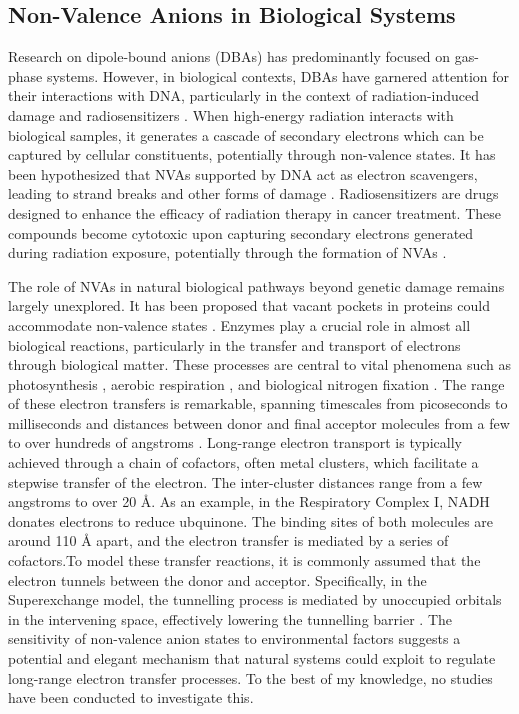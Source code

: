 \subsection{Non-Valence Anions in Biological Systems}

Research on dipole-bound anions (DBAs) has predominantly focused on gas-phase systems. However, in biological contexts, DBAs have garnered attention for their interactions with DNA, particularly in the context of radiation-induced damage and radiosensitizers \cite{gu2012interactions,narayanan2023secondary,sedmidubska2024interaction}.
When high-energy radiation interacts with biological samples, it generates a cascade of secondary electrons which can be captured by cellular constituents, potentially through non-valence states. It has been hypothesized that NVAs supported by DNA act as electron scavengers, leading to strand breaks and other forms of damage \cite{gu2012interactions,narayanan2023secondary,dutta2015electron,narayanan2024electron,sommerfeld2005dipole}.
Radiosensitizers are drugs designed to enhance the efficacy of radiation therapy in cancer treatment. These compounds become cytotoxic upon capturing secondary electrons generated during radiation exposure, potentially through the formation of NVAs \cite{sedmidubska2024interaction}.

The role of NVAs in natural biological pathways beyond genetic damage remains largely unexplored. It has been proposed that vacant pockets in proteins could accommodate non-valence states \cite{castellani2019stability}. Enzymes play a crucial role in almost all biological reactions, particularly in the transfer and transport of electrons through biological matter. These processes are central to vital phenomena such as photosynthesis \cite{mitchell1961coupling}, aerobic respiration \cite{wikstrom1977proton}, and biological nitrogen fixation \cite{rutledge2020electron}. The range of these electron transfers is remarkable, spanning timescales from picoseconds to milliseconds and distances between donor and final acceptor molecules from a few to over hundreds of angstroms \cite{gray1996electron,blumberger2015recent}. Long-range electron transport is typically achieved through a chain of cofactors, often metal clusters, which facilitate a stepwise transfer of the electron. The inter-cluster distances range from a few angstroms to over 20 \r{A}. As an example, in the Respiratory Complex I\cite{ernster1995biochemical}, NADH donates electrons to reduce ubquinone. The binding sites of both molecules are around 110 \r{A} apart, and the electron transfer is mediated by a series of cofactors.To model these transfer reactions, it is commonly assumed that the electron tunnels between the donor and acceptor. Specifically, in the Superexchange model, the tunnelling process is mediated by unoccupied orbitals in the intervening space, effectively lowering the tunnelling barrier \cite{blumberger2015recent}. The sensitivity of non-valence anion states to environmental factors suggests a potential and elegant mechanism that natural systems could exploit to regulate long-range electron transfer processes. To the best of my knowledge, no studies have been conducted to investigate this.

